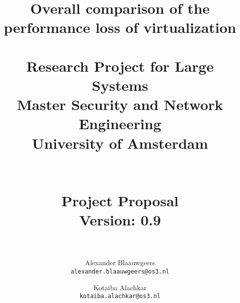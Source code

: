 \documentclass[a4paper, 12pt, one column]{article}
\title{ Overall comparison of the performance
loss of virtualization \\~\\
\large Research Project for Large Systems
\\Master Security and Network Engineering \\ University of Amsterdam\\~\\
\\Project Proposal\\
\textbf{Version:} 0.9\\~\\}
\author{Alexander Blaauwgeers \\ \texttt{alexander.blaauwgeers@os3.nl} \and Kotaiba Alachkar   \\ \texttt{kotaiba.alachkar@os3.nl}}
\begin{document}
\maketitle
\clearpage
\begin{multicols}{2}














\end{multicols}

\nocite{*}
\printbibliography
\end{document}
